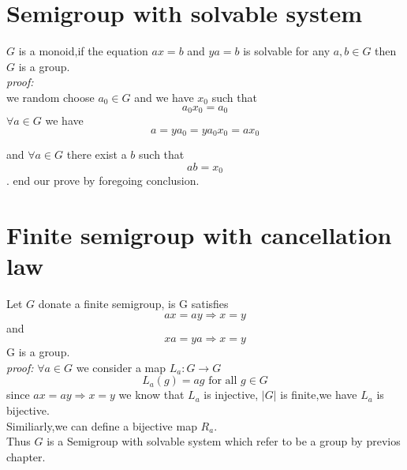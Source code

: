 \documentclass[a4paper,12pt]{article}
\begin{document}
\section{Semigroup with solvable system}
$G$ is a monoid,if the equation $ax=b$ and $ya=b$ is solvable for any $a,b \in G$ then $G$ is a group.\\
\textit{proof:} \\
we random choose $a_0 \in G$ and we have $x_0$ such that
\[ a_0x_0=a_0 \]
$\forall a \in G$ we have
\[ a = ya_0 = ya_0x_0 = ax_0 \]

and $\forall a \in G$ there exist a $b$ such that
\[ ab = x_0 \].
end our prove by foregoing conclusion.

\section{Finite semigroup with cancellation law}
Let $G$ donate a finite semigroup, is G satisfies
\[ ax=ay \Rightarrow x=y \]
and
\[ xa=ya \Rightarrow x=y \]
G is a group.\\
\textit{proof:} 
$\forall a \in G$ we consider a map $L_a \colon G \to G$
\[ L_a(g) = ag \text{ for all } g \in G \]
since $ ax=ay \Rightarrow x=y $
we know that $L_a$ is injective, $|G|$ is finite,we have $L_a$ is bijective.\\
Similiarly,we can define a bijective map $R_a$.\\
Thus $G$ is a Semigroup with solvable system which refer to be a group by previos chapter.
\end{document}
